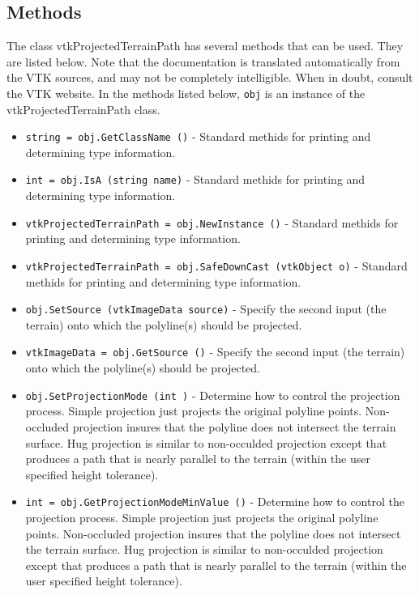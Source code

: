 \subsection{Methods}

The class vtkProjectedTerrainPath has several methods that can be used.
  They are listed below.
Note that the documentation is translated automatically from the VTK sources,
and may not be completely intelligible.  When in doubt, consult the VTK website.
In the methods listed below, \verb|obj| is an instance of the vtkProjectedTerrainPath class.
\begin{itemize}
\item  \verb|string = obj.GetClassName ()| -  Standard methids for printing and determining type information.

\item  \verb|int = obj.IsA (string name)| -  Standard methids for printing and determining type information.

\item  \verb|vtkProjectedTerrainPath = obj.NewInstance ()| -  Standard methids for printing and determining type information.

\item  \verb|vtkProjectedTerrainPath = obj.SafeDownCast (vtkObject o)| -  Standard methids for printing and determining type information.

\item  \verb|obj.SetSource (vtkImageData source)| -  Specify the second input (the terrain) onto which the polyline(s) should
 be projected.

\item  \verb|vtkImageData = obj.GetSource ()| -  Specify the second input (the terrain) onto which the polyline(s) should
 be projected.

\item  \verb|obj.SetProjectionMode (int )| -  Determine how to control the projection process. Simple projection
 just projects the original polyline points. Non-occluded projection
 insures that the polyline does not intersect the terrain surface.
 Hug projection is similar to non-occulded projection except that
 produces a path that is nearly parallel to the terrain (within the
 user specified height tolerance).

\item  \verb|int = obj.GetProjectionModeMinValue ()| -  Determine how to control the projection process. Simple projection
 just projects the original polyline points. Non-occluded projection
 insures that the polyline does not intersect the terrain surface.
 Hug projection is similar to non-occulded projection except that
 produces a path that is nearly parallel to the terrain (within the
 user specified height tolerance).


\end{itemize}
